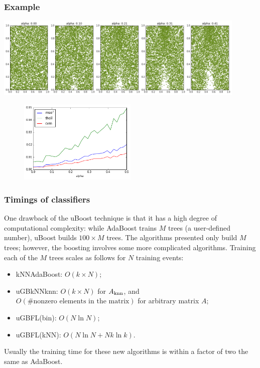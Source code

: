 \documentclass{beamer}
\begin{document}
\begin{frame}
    \frametitle{Example}

    {
    \centering

    \includegraphics[width=0.9\textwidth]{img/metrics_comp1.png}

    
    \begin{figure}
    \centering

    \includegraphics[width=0.5\textwidth]{img/metrics_comp2.png}
    \end{figure}
    }
\end{frame}

\begin{frame}[t]
    \frametitle{Timings of classifiers}
    One drawback of the uBoost technique is that it has a high degree of computational complexity: 
    while AdaBoost trains $M$ trees (a user-defined number), uBoost builds $100 \times M$ trees.  
    The algorithms presented only build $M$ trees; however, the boosting involves some more complicated algorithms.  Training each of the $M$ trees scales as follows for $N$ training events:
    \begin{itemize}
           \item kNNAdaBoost: $O(k \times N)$;
        \item uGBkNNknn: $O(k \times N)$ for $A_{\rm knn}$, and  
        $O( \text{\#nonzero elements in the matrix})$ for arbitrary matrix $A$;
        \item uGBFL(bin): $O(N \ln N)$;
        \item uGBFL(kNN): $O(N \ln N + N k \ln k) $.
    \end{itemize}

    Usually the training time for these new algorithms is within a factor of two the same as AdaBoost.  

\end{frame}
\end{document}
